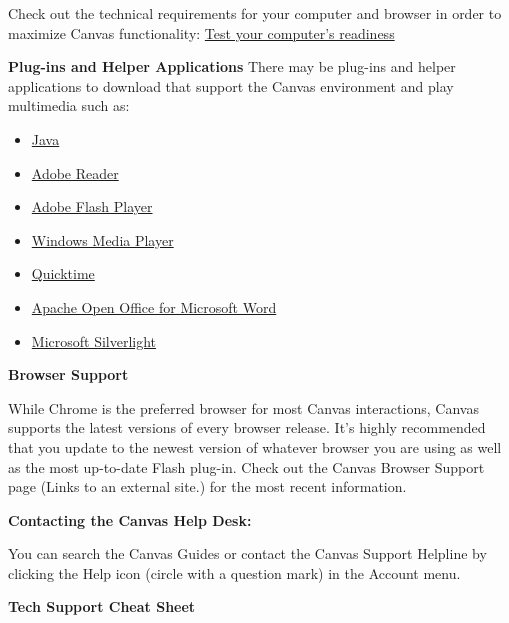 Check out the technical requirements for your computer and browser in order to maximize Canvas functionality: \href{https://apps.3cmediasolutions.org/oei/tools/computer-readiness.html}{Test your computer's readiness}

\textbf{Plug-ins and Helper Applications}
There may be plug-ins and helper applications to download that support the Canvas environment and play multimedia such as:

\begin{itemize}
\tightlist
\item
  \href{https://www.java.com/en/download/}{Java}
\item
  \href{https://get.adobe.com/cn/reader/}{Adobe Reader}
\item
  \href{https://www.flash.cn/}{Adobe Flash Player}
\item
  \href{https://support.microsoft.com/en-us/windows/get-windows-media-player-81718e0d-cfce-25b1-aee3-94596b658287}{Windows Media Player}
\item
  \href{https://support.apple.com/kb/DL837?locale=zh_CN}{Quicktime}
\item
  \href{https://www.openoffice.org/download/index.html}{Apache Open Office for Microsoft Word}
\item
  \href{https://www.microsoft.com/silverlight/}{Microsoft Silverlight}
\end{itemize}

\textbf{Browser Support}

While Chrome is the preferred browser for most Canvas interactions, Canvas supports the latest versions of every browser release. It's highly recommended that you update to the newest version of whatever browser you are using as well as the most up-to-date Flash plug-in. Check out the Canvas Browser Support page (Links to an external site.) for the most recent information.

\textbf{Contacting the Canvas Help Desk:}

You can search the Canvas Guides or contact the Canvas Support Helpline by clicking the Help icon (circle with a question mark) in the Account menu.

\textbf{Tech Support Cheat Sheet}

